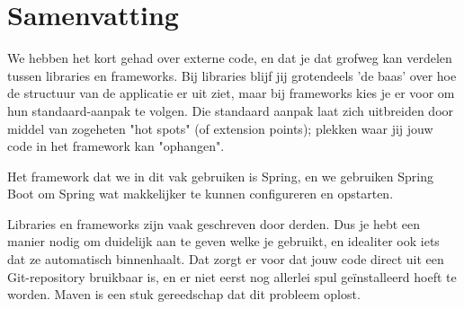 \section{Samenvatting}

We hebben het kort gehad over externe code, en dat je dat grofweg kan verdelen tussen libraries en frameworks.
Bij libraries blijf jij grotendeels 'de baas' over hoe de structuur van de applicatie er uit ziet,
maar bij frameworks kies je er voor om hun standaard-aanpak te volgen. Die standaard aanpak laat zich
uitbreiden door middel van zogeheten "hot spots" (of extension points); plekken waar jij jouw code in het
framework kan "ophangen".

Het framework dat we in dit vak gebruiken is Spring, en we gebruiken Spring Boot om Spring wat makkelijker
te kunnen configureren en opstarten.

Libraries en frameworks zijn vaak geschreven door derden. Dus je hebt een manier nodig om duidelijk aan 
te geven welke je gebruikt, en idealiter ook iets dat ze automatisch binnenhaalt. Dat zorgt er voor
dat jouw code direct uit een Git-repository bruikbaar is, en er niet eerst nog allerlei spul geïnstalleerd
hoeft te worden. Maven is een stuk gereedschap dat dit probleem oplost.